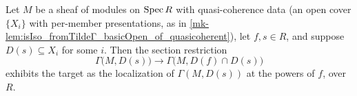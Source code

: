 \begin{lemma}
  \label{mk-lem:section_localization_hfr_basicOpen}
  \leanok

  Let \(M\) be a sheaf of modules on \(\operatorname{Spec} R\) with quasi-coherence data (an open cover
  \(\{X_i\}\) with per-member presentations, as in
  \ref{mk-lem:isIso_fromTildeΓ_basicOpen_of_quasicoherent}), let \(f, s \in R\), and
  suppose \(D(s) \subseteq X_i\) for some \(i\). Then the section restriction
  \[
    \Gamma\bigl(M, D(s)\bigr) \longrightarrow \Gamma\bigl(M, D(f) \cap D(s)\bigr)
  \]
  exhibits the target as the localization of \(\Gamma(M, D(s))\) at the powers of \(f\),
  over \(R\).
\end{lemma}
